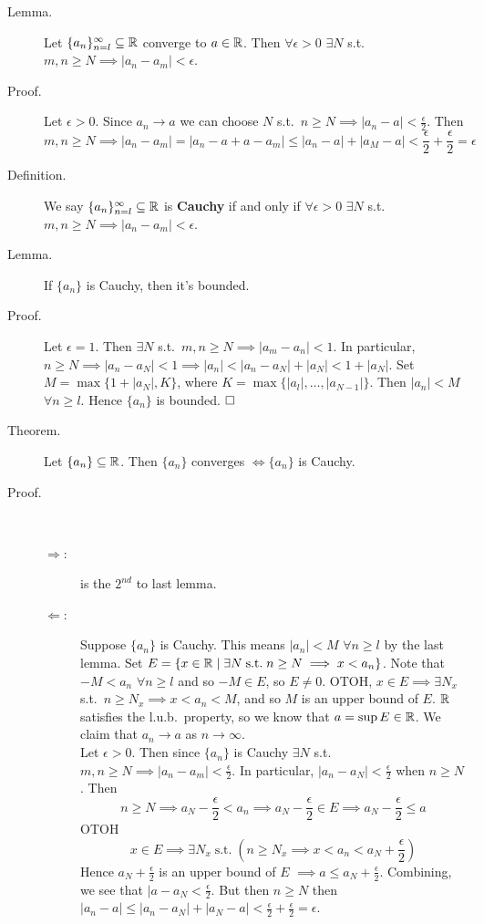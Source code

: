 \documentclass[letterpaper,11pt]{article}
\begin{document}
\begin{description}
\item[Lemma.] Let $\{a_n\}_{n=l}^\infty\subseteq\mathbb{R}$ converge to $a\in\mathbb{R}$.
    Then $\forall \epsilon>0$ $\exists N$ s.t.\
    $m,n\ge N\implies |a_n-a_m|<\epsilon$.

\item[Proof.] Let $\epsilon>0$. Since $a_n\to a$ we can choose $N$ s.t.\
    $n\ge N\implies|a_n-a|<\frac{\epsilon}{2}$. Then \[
    m,n\ge N\implies |a_n-a_m|=|a_n-a+a-a_m|
    \le|a_n-a|+|a_M-a|<\frac{\epsilon}{2}+ \frac{\epsilon}{2}=\epsilon
    \]


\item[Definition.] We say $\{a_n\}_{n=l}^\infty\subseteq\mathbb{R}$ is
    \textbf{Cauchy} if and only if $\forall\epsilon>0$ $\exists N$
    s.t.\ $m,n\ge N\implies|a_n-a_m|<\epsilon$.


\item[Lemma.] If $\{a_n\}$ is Cauchy, then it's bounded.
\item[Proof.] Let $\epsilon=1$. Then $\exists N$ s.t.\
    $m,n\ge N\implies|a_m-a_n|<1$. In particular, $n\ge N\implies
    |a_n-a_N|<1\implies|a_n|<|a_n-a_N|+|a_N|<1+|a_N|$. Set
    $M=\max\{1+|a_N|,K\}$, where $K=\max\{|a_l|,\ldots,|a_{N-1}|\}$.
    Then $|a_n|<M$ $\forall n\ge l$. Hence $\{a_n\}$ is bounded.
    $\hfill\square$


\item[Theorem.] Let $\{a_n\}\subseteq\mathbb{R}$. Then $\{a_n\}$ converges
    $\iff\{a_n\}$ is Cauchy.

\item[Proof.]\text{}\vspace{-0.2in}\\
  \begin{description}
  \item[$\Longrightarrow$:] is the $2^{nd}$ to last lemma.
  \item[$\Longleftarrow$:] Suppose $\{a_n\}$ is Cauchy.
      This means $|a_n|<M$ $\forall n\ge l$ by the last lemma.
      Set $E=\{x\in\mathbb{R}\;|\;\exists N\;\text{s.t.}\;n\ge N\implies x<a_n\}$.
      Note that $-M<a_n$ $\forall n\ge l$ and so $-M\in E$, so $E\ne0$.
      OTOH, $x\in E\implies\exists N_x$ s.t.\ $n\ge N_x\implies x<a_n<M$,
      and so $M$ is an upper bound of $E$. $\mathbb{R}$ satisfies the l.u.b.\
      property, so we know that $a=\sup E\in\mathbb{R}$. We claim that
      $a_n\to a$ as $n\to\infty$.\\
      Let $\epsilon>0$. Then since $\{a_n\}$ is Cauchy $\exists N$
      s.t.\ $m,n\ge N\implies|a_n-a_m|<\frac{\epsilon}{2}$.
      In particular, $|a_n-a_N|<\frac{\epsilon}{2}$ when $n\ge N$.
      Then \[
      n\ge N\implies a_N-\frac{\epsilon}{2}<a_n\implies
      a_N-\frac{\epsilon}{2}\in E\implies a_N-\frac{\epsilon}{2}\le a
      \]
      OTOH \[
      x\in E\implies \exists N_x\;\text{s.t.}\;\left(
        n\ge N_x\implies x<a_n<a_N+\frac{\epsilon}{2}\right)
      \]
      Hence $a_N+\frac{\epsilon}{2}$ is an upper bound of $E$
      $\implies a\le a_N+\frac{\epsilon}{2}$. Combining, we see that
      $|a-a_N<\frac{\epsilon}{2}$. But then $n\ge N$ then
      $|a_n-a|\le|a_n-a_N|+|a_N-a|<\frac{\epsilon}{2}+\frac{\epsilon}{2}=\epsilon$.


\end{description}
\end{description}
\end{document}
